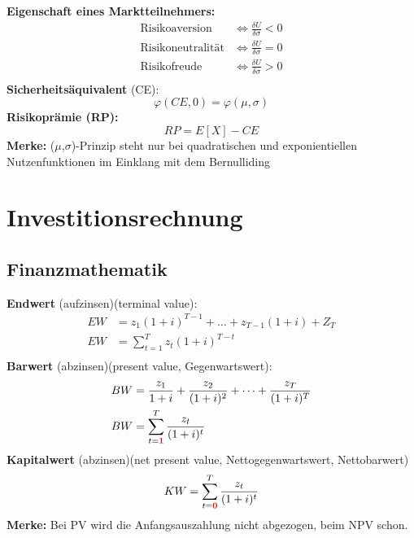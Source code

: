\documentclass[leqno]{scrartcl}
\begin{document}
\begin{multicols}{4}
\textbf{Eigenschaft eines Marktteilnehmers:}
  \begin{equation*}
    \begin{split}
      \text{Risikoaversion}    &\Leftrightarrow \frac{\delta U}{\delta \sigma} < 0 \\
      \text{Risikoneutralität} &\Leftrightarrow \frac{\delta U}{\delta \sigma} = 0 \\
      \text{Risikofreude}      &\Leftrightarrow \frac{\delta U}{\delta \sigma} > 0 \\
    \end{split}
  \end{equation*}
\textbf{Sicherheitsäquivalent} (CE):
  \begin{equation*}
    \varphi(CE, 0) = \varphi(\mu, \sigma)
  \end{equation*}
\textbf{Risikoprämie (RP):}
  \begin{equation*}
    RP = E[X] - CE
  \end{equation*}
\textbf{Merke:} ($\mu$,$\sigma$)-Prinzip steht nur bei quadratischen und
exponientiellen Nutzenfunktionen im Einklang mit dem Bernulliding


\section{Investitionsrechnung}

\subsection{Finanzmathematik}

\textbf{Endwert} (aufzinsen)(terminal value):
  \begin{equation*}
    \begin{split}
      EW &= z_1(1+i)^{T-1} + \dots + z_{T-1}(1+i) + Z_T \\
      EW &= \sum^T_{t=1} z_t (1+i)^{T-t}\\
    \end{split}
  \end{equation*}
\textbf{Barwert} (abzinsen)(present value, Gegenwartswert):
  \begin{equation*}
    \begin{split}
      BW &= \frac{z_1}{1+i}+\frac{z_2}{(1+i)^2}+\dots+\frac{z_T}{(1+i)^T}\\
      BW &= \sum^T_{t=\color{red}{\textbf{1}}}\frac{z_t}{(1+i)^t}\\
    \end{split}
  \end{equation*}
\textbf{Kapitalwert} (abzinsen)(net present value‚ Nettogegenwartswert, Nettobarwert)
  \begin{equation*}
    KW = \sum^T_{t=\color{red}{\textbf{0}}}\frac{z_t}{(1+i)^t}
  \end{equation*}
\textbf{Merke:} Bei PV wird die Anfangsauszahlung nicht abgezogen, beim NPV schon.


\end{multicols}
\end{document}
